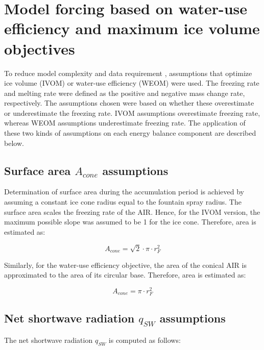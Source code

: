 \documentclass[tc, manuscript]{copernicus}
\begin{document}
\appendix


\section{Model forcing based on water-use efficiency and maximum ice volume objectives} \label{sec:SEB}

To reduce model complexity and data requirement \citep{balasubramanianInfluenceMeteorologicalConditions2022},
assumptions that optimize ice volume (IVOM) or water-use efficiency (WEOM) were used. The freezing rate and
melting rate were defined as the positive and negative mass change rate, respectively. The assumptions chosen
were based on whether these overestimate or underestimate the freezing rate. IVOM assumptions overestimate
freezing rate, whereas WEOM assumptions underestimate freezing rate. The application of these two kinds of assumptions
on each energy balance component are described below. 

\subsection{Surface area $A_{cone}$ assumptions}

Determination of surface area during the accumulation period is achieved by assuming a constant ice cone
radius equal to the fountain spray radius. The surface area scales the freezing rate of the AIR. Hence, for the
IVOM version, the maximum possible slope was assumed to be 1 for the ice cone. Therefore, area is estimated as:  

\begin{equation} A_{cone} =\sqrt{2} \cdot \pi \cdot r_{F}^2  \end{equation}

Similarly, for the water-use efficiency objective, the area of the conical AIR is approximated to the area of
its circular base. Therefore, area is estimated as:

\begin{equation} A_{cone} =\pi \cdot r_{F}^2  \end{equation}

\subsection{Net shortwave radiation \texorpdfstring{$q_{SW}$}{Lg} assumptions}
\label{sec:SW}

The net shortwave radiation $q_{SW}$ is computed as follows:
\end{document}

